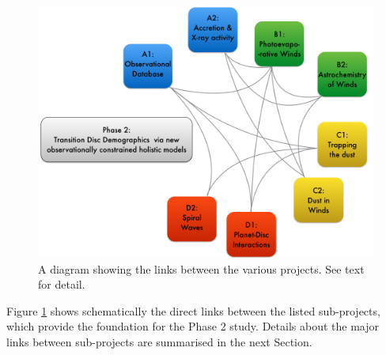 \documentclass[10pt,fleqn,twoside]{article}
\begin{document}
\begin{figure}
\centerline{\includegraphics[width=13cm]{figures/dependency2.jpg}}
\caption{\label{fig-diagram-links}A diagram showing the links between the various
projects. See text for detail. }
\end{figure}

Figure \ref{fig-diagram-links} shows schematically the direct links between
the listed sub-projects, which provide the foundation for the Phase 2
study.  Details about the major links between
sub-projects are summarised in the next Section.\\

%
\end{document}
